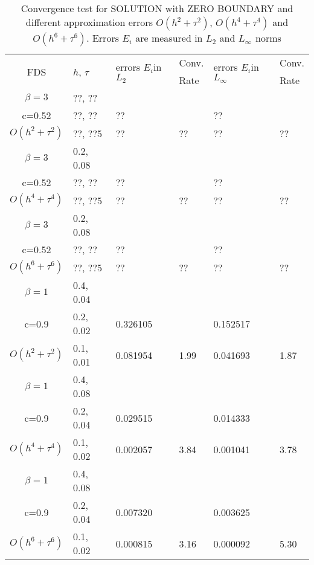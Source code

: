 \documentclass{article}
\begin{document}
\begin{table}[ht]
\centering
\small
		\begin{tabular}{||c|l|ll|ll||}
			\hline
			\hline
      \multirow{2  }{*}{FDS}        & \multirow{2  }{*}{$h$, $\tau$}  & \multirow{2  }{*}{errors $E_i$in$L_2$}  &Conv.& \multirow{2  }{*}{errors $E_i$in$L_\infty$}  &Conv.  \\
	         &                    &                               & Rate   &                                        & Rate \\
   			\hline 
					\hline 
  $\beta=3$       &??, ??   &            &        &                  &      \\
      c=0.52   &??, ??   &?? &           &??      &       \\
     $O(h^2 + \tau^ 2)$ &??, ??5 &?? &??  &?? & ??       \\
			\hline 
   $\beta=3$        &0.2, 0.08   &            &        &                  &      \\
   c=0.52  &??, ??   &?? &           &??      &       \\
     $O(h^4+ \tau^4)$ &??, ??5 &?? &??  &?? & ??       \\
			\hline 
  $\beta=3$               &0.2, 0.08   &            &        &                  &      \\
   c=0.52                  &??, ??   &?? &           &??      &       \\
     $O(h^6+ \tau^6)$ &??, ??5 &?? &??  &?? & ??       \\
	   \hline
			\hline 
       $\beta=1$       &0.4, 0.04        &             &            &           &   \\
                  c=0.9    &0.2, 0.02       &0.326105   &            &0.152517&   \\
  $O(h^2+ \tau^2)$ &0.1, 0.01   &0.081954  &1.99 &0.041693  & 1.87 \\
			\hline
      $\beta=1$               &0.4, 0.08    &            &               &             &    \\
       c=0.9                     &0.2, 0.04     & 0.029515   &        &  0.014333   &   \\
       $O(h^4+ \tau^4)$ &0.1, 0.02   &0.002057 & 3.84   & 0.001041  & 3.78  \\
    \hline
  $\beta=1$     &0.4, 0.08   &            &          &                  &      \\
      c=0.9                    &0.2, 0.04   &0.007320 &           & 0.003625      &       \\
     $O(h^6+ \tau^6)$ &0.1, 0.02 & 0.000815 &3.16 & 0.000092  & 5.30        \\
	   \hline
			\hline 
		\end{tabular}
		\caption{Convergence test for SOLUTION with ZERO BOUNDARY and different approximation errors $O(h^{2} + \tau^2 )$, $O(h^{4} + \tau^4 )$ and $O(h^{6} + \tau^6 )$. Errors $E_i$ are measured in $L_2$ and $L_\infty$ norms}
\label{tableA}
\end{table}
\end{document}
